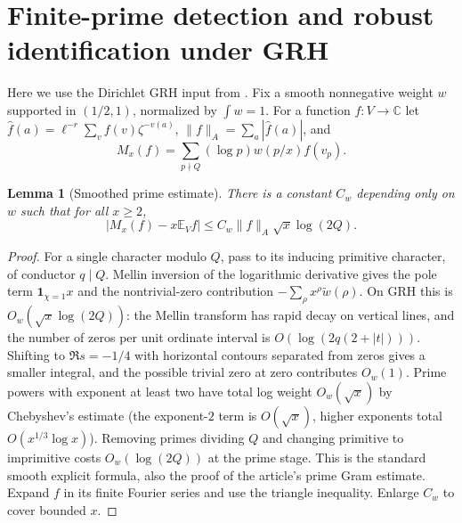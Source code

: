 \documentclass[11pt]{article}
\newtheorem{lemma}[theorem]{Lemma}
\theoremstyle{remark}\newtheorem{remark}[theorem]{Remark}
\newcommand{\C}{\mathbb C}
\newcommand{\E}{\mathbb E}
\newcommand{\ind}{\mathbf 1}
\begin{document}
\section{Finite-prime detection and robust identification under GRH}\label{sec:finite}
Here we use the Dirichlet GRH input from \cite{vendor,article}. Fix a smooth nonnegative weight $w$ supported in $(1/2,1)$, normalized by $\int w=1$. For a function $f:V\to\C$ let $\widehat f(a)=\ell^{-r}\sum_v f(v)\zeta^{-v(a)}$, $\|f\|_A=\sum_a|\widehat f(a)|$, and
\[
 M_x(f)=\sum_{p\nmid Q}(\log p)w(p/x)f(v_p).
\]
\begin{lemma}[Smoothed prime estimate]\label{lem:prime}
There is a constant $C_w$ depending only on $w$ such that for all $x\ge2$,
\begin{equation}\label{eq:prime}
 |M_x(f)-x\E_V f|\le C_w\|f\|_A\sqrt x\log(2Q).
\end{equation}
\end{lemma}
\begin{proof}
For a single character modulo $Q$, pass to its inducing primitive character, of conductor $q\mid Q$. Mellin inversion of the logarithmic derivative gives the pole term $\ind_{\chi=1}x$ and the nontrivial-zero contribution $-\sum_\rho x^\rho\widetilde w(\rho)$. On GRH this is $O_w(\sqrt x\log(2Q))$: the Mellin transform has rapid decay on vertical lines, and the number of zeros per unit ordinate interval is $O(\log(2q(2+|t|)))$. Shifting to $\Re s=-1/4$ with horizontal contours separated from zeros gives a smaller integral, and the possible trivial zero at zero contributes $O_w(1)$. Prime powers with exponent at least two have total log weight $O_w(\sqrt x)$ by Chebyshev's estimate (the exponent-$2$ term is $O(\sqrt x)$, higher exponents total $O(x^{1/3}\log x)$). Removing primes dividing $Q$ and changing primitive to imprimitive costs $O_w(\log(2Q))$ at the prime stage. This is the standard smooth explicit formula, also the proof of the article's prime Gram estimate. Expand $f$ in its finite Fourier series and use the triangle inequality. Enlarge $C_w$ to cover bounded $x$.
\end{proof}
\end{document}
